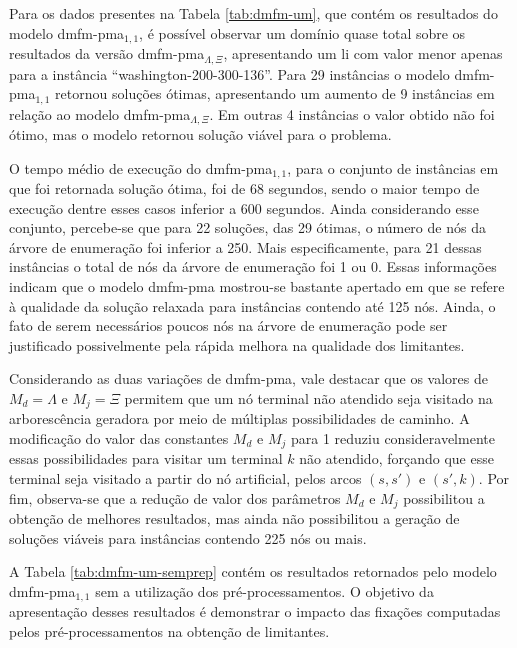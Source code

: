 Para os dados presentes na Tabela \ref{tab:dmfm-um}, que contém os resultados do
modelo \gls{dmfm-pma}$_{1, 1}$, é possível observar um domínio quase total sobre
os  resultados  da  versão   \gls{dmfm-pma}$_{\Lambda,  \Xi}$,  apresentando  um
\gls{li}  com valor  menor apenas  para a  instância ``washington-200-300-136''.
Para 29  instâncias o modelo  \gls{dmfm-pma}$_{1, 1}$ retornou  soluções ótimas,
apresentando   um   aumento    de   9   instâncias   em    relação   ao   modelo
\gls{dmfm-pma}$_{\Lambda, \Xi}$. Em  outras 4 instâncias o valor  obtido não foi
ótimo, mas o modelo retornou solução viável para o problema.

O  tempo médio  de  execução  do \gls{dmfm-pma}$_{1,  1}$,  para  o conjunto  de
instâncias em que foi retornada solução ótima, foi de 68 segundos, sendo o maior
tempo de execução dentre esses casos inferior a 600 segundos. Ainda considerando
esse conjunto, percebe-se que  para 22 soluções, das 29 ótimas,  o número de nós
da árvore de enumeração foi inferior a 250. Mais especificamente, para 21 dessas
instâncias o total de nós da árvore  de enumeração foi 1 ou 0. Essas informações
indicam  que o  modelo \gls{dmfm-pma}  mostrou-se  bastante apertado  em que  se
refere à  qualidade da solução  relaxada para  instâncias contendo até  125 nós.
Ainda, o fato de  serem necessários poucos nós na árvore  de enumeração pode ser
justificado possivelmente pela rápida melhora na qualidade dos limitantes.

Considerando as duas  variações de \gls{dmfm-pma}, vale destacar  que os valores
de $M_d = \Lambda$  e $M_j = \Xi$ permitem que um nó  terminal não atendido seja
visitado  na arborescência  geradora  por meio  de  múltiplas possibilidades  de
caminho. A  modificação do  valor das  constantes $M_d$ e  $M_j$ para  1 reduziu
consideravelmente  essas  possibilidades  para   visitar  um  terminal  $k$  não
atendido, forçando  que esse terminal seja  visitado a partir do  nó artificial,
pelos arcos $(s,  s')$ e $(s', k)$.  Por fim, observa-se que a  redução de valor
dos parâmetros $M_d$ e $M_j$ possibilitou a obtenção de melhores resultados, mas
ainda não  possibilitou a geração  de soluções viáveis para  instâncias contendo
225 nós ou mais.


A Tabela  \ref{tab:dmfm-um-semprep} contém os resultados  retornados pelo modelo
\gls{dmfm-pma}$_{1, 1}$ sem  a utilização dos pré-processamentos.  O objetivo da
apresentação desses  resultados é demonstrar  o impacto das  fixações computadas
pelos pré-processamentos na obtenção de limitantes.

